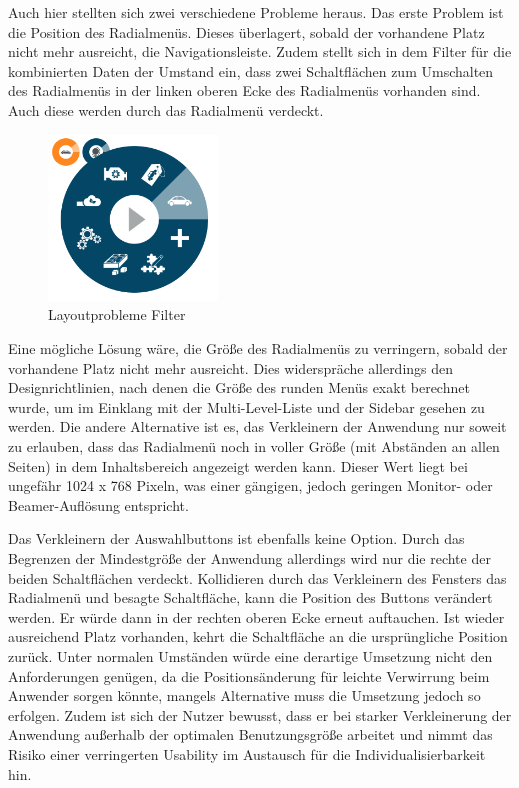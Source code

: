 Auch hier stellten sich zwei verschiedene Probleme heraus. Das erste Problem ist die Position des Radialmenüs. Dieses überlagert, sobald der vorhandene Platz nicht mehr ausreicht, die Navigationsleiste. Zudem stellt sich in dem Filter für die kombinierten Daten der Umstand ein, dass zwei Schaltflächen zum Umschalten des Radialmenüs in der linken oberen Ecke des Radialmenüs vorhanden sind. Auch diese werden durch das Radialmenü verdeckt.\par
\begin{figure}[H]
 \centering
 \includegraphics[width=0.4\textwidth]{grafiken/radial_bug2.png}
 \caption{Layoutprobleme Filter}
 \label{fig:layoutLtueFilter}
\end{figure}
Eine mögliche Lösung wäre, die Größe des Radialmenüs zu verringern, sobald der vorhandene Platz nicht mehr ausreicht. Dies widerspräche allerdings den Designrichtlinien, nach denen die Größe des runden Menüs exakt berechnet wurde, um im Einklang mit der Multi-Level-Liste und der Sidebar gesehen zu werden. Die andere Alternative ist es, das Verkleinern der Anwendung nur soweit zu erlauben, dass das Radialmenü noch in voller Größe (mit Abständen an allen Seiten) in dem Inhaltsbereich angezeigt werden kann. Dieser Wert liegt bei ungefähr 1024 x 768 Pixeln, was einer gängigen, jedoch geringen Monitor- oder Beamer-Auflösung entspricht.\par
Das Verkleinern der Auswahlbuttons ist ebenfalls keine Option. Durch das Begrenzen der Mindestgröße der Anwendung allerdings wird nur die rechte der beiden Schaltflächen verdeckt. Kollidieren durch das Verkleinern des Fensters das Radialmenü und besagte Schaltfläche, kann die Position des Buttons verändert werden. Er würde dann in der rechten oberen Ecke erneut auftauchen. Ist wieder ausreichend Platz vorhanden, kehrt die Schaltfläche an die ursprüngliche Position zurück. Unter normalen Umständen würde eine derartige Umsetzung nicht den Anforderungen genügen, da die Positionsänderung für leichte Verwirrung beim Anwender sorgen könnte, mangels Alternative muss die Umsetzung jedoch so erfolgen. Zudem ist sich der Nutzer bewusst, dass er bei starker Verkleinerung der Anwendung außerhalb der optimalen Benutzungsgröße arbeitet und nimmt das Risiko einer verringerten Usability im Austausch für die Individualisierbarkeit hin.\par

